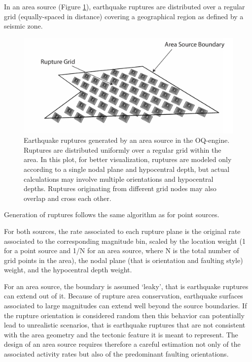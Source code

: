 In an area source (Figure \ref{fig:AreaSource}), earthquake ruptures are distributed over a regular grid (equally-spaced in distance) covering a geographical region as defined by a seismic zone. 
\begin{figure}
\centering
\includegraphics[width=14cm]{./Pictures/AreaSource.pdf}
\caption{Earthquake ruptures generated by an area source in the OQ-engine. Ruptures are distributed uniformly over a regular grid within the area. In this plot, for better visualization, ruptures are modeled only according to a single nodal plane and hypocentral depth, but actual calculations may involve multiple orientations and hypocentral depths. Ruptures originating from different grid nodes may also overlap and cross each other.}
\label{fig:AreaSource}
\end{figure}
Generation of ruptures follows the same algorithm as for point sources.

For both sources, the rate associated to each rupture plane is the original rate associated to the corresponding magnitude bin, scaled by the location weight (1 for a point source and 1/N for an area source, where N is the total number of grid points in the area), the nodal plane (that is orientation and faulting style) weight, and the hypocentral depth weight.

For an area source, the boundary is assumed ‘leaky’, that is earthquake ruptures can extend out of it. Because of rupture area conservation, earthquake surfaces associated to large magnitudes can extend well beyond the source boundaries. If the rupture orientation is considered random then this behavior can potentially lead to unrealistic scenarios, that is earthquake ruptures that are not consistent with the area geometry and the tectonic feature it is meant to represent. The design of an area source requires therefore a careful estimation not only of the associated activity rates but also of the predominant faulting orientations.

